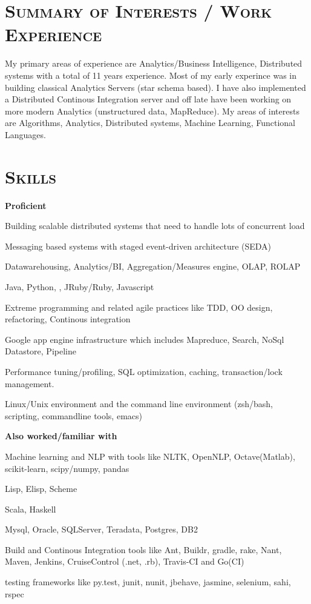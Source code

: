 \begin{resume}




\section{\textsc{Summary of Interests / Work Experience}}
My primary areas of experience are Analytics/Business Intelligence, Distributed systems with a total of 11 years experience. Most of my early experince was in building classical Analytics Servers (star schema based). I have also implemented a Distributed Continous Integration server and off late have been working on more modern Analytics (unstructured data, MapReduce). My areas of interests are Algorithms, Analytics, Distributed systems, Machine Learning, Functional Languages.

\section{\textsc{Skills}} 
{\textbf{Proficient}}
\begin{mylist}
  \item Building scalable distributed systems that need to handle lots of concurrent load
  \item Messaging based systems with staged event-driven architecture (SEDA)
  \item Datawarehousing, Analytics/BI, Aggregation/Measures engine, OLAP, ROLAP
  \item Java, Python, \CSharp,  JRuby/Ruby, Javascript
  \item Extreme programming and related agile practices like TDD, OO design, refactoring, Continous integration
  \item Google app engine infrastructure which includes Mapreduce, Search, NoSql Datastore, Pipeline
  \item Performance tuning/profiling, SQL optimization, caching, transaction/lock management.
  \item Linux/Unix environment and the command line environment (zsh/bash, scripting, commandline tools, emacs)
\end{mylist}

{\textbf{Also worked/familiar with}}
\begin{mylist}
  \item Machine learning and NLP with tools like NLTK, OpenNLP, Octave(Matlab), scikit-learn, scipy/numpy, pandas
  \item Lisp, Elisp, Scheme
  \item Scala, Haskell
  \item Mysql, Oracle, SQLServer, Teradata, Postgres, DB2
  \item Build and Continous Integration tools like Ant, Buildr, gradle, rake, Nant, Maven,  Jenkins, CruiseControl (.net, .rb), Travis-CI and Go(CI)
  \item testing frameworks like py.test, junit, nunit, jbehave, jasmine, selenium, sahi, rspec
\end{mylist}




\end{resume}
